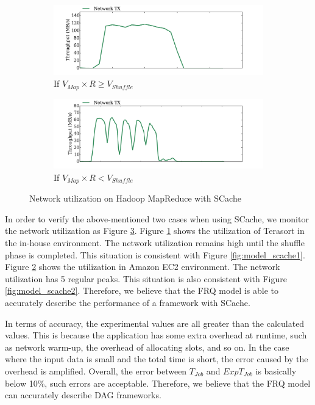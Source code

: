 {\begin{figure}
	\centering
	\begin{subfigure}{.47\linewidth}
		\includegraphics[width=\linewidth]{fig/hadoop_net1}
		\caption{\color{blue}If \(V_{Map} \times R \ge V_{Shuffle}\)}
		\label{fig:hadoop_net1}
	\end{subfigure}
	\begin{subfigure}{.47\linewidth}
		\includegraphics[width=\linewidth]{fig/hadoop_net2}
		\caption{\color{blue}If \(V_{Map} \times R < V_{Shuffle}\)}
		\label{fig:hadoop_net2}
	\end{subfigure}
	\caption{\color{blue}Network utilization on Hadoop MapReduce with SCache}
	\label{fig:hadoop_net}
\end{figure}

In order to verify the above-mentioned two cases when using SCache, we monitor the network utilization as Figure \ref{fig:hadoop_net}. Figure \ref{fig:hadoop_net1} shows the utilization of Terasort in the in-house environment. The network utilization remains high until the shuffle phase is completed. This situation is consistent with Figure \ref{fig:model_scache1}. Figure \ref{fig:hadoop_net2} shows the utilization in Amazon EC2 environment. 
The network utilization has 5 regular peaks. This situation is also consistent with Figure \ref{fig:model_scache2}. Therefore, we believe that the FRQ model is able to accurately describe the performance of a framework with SCache.

In terms of accuracy, the experimental values are all greater than the calculated values. This is because the application has some extra overhead at runtime, such as network warm-up, the overhead of allocating slots, and so on. In the case where the input data is small and the total time is short, the error caused by the overhead is amplified. Overall, the error between \(T_{Job}\) and \(ExpT_{Job}\) is basically below 10\%, such errors are acceptable. Therefore, we believe that the FRQ model can accurately describe DAG frameworks.
}